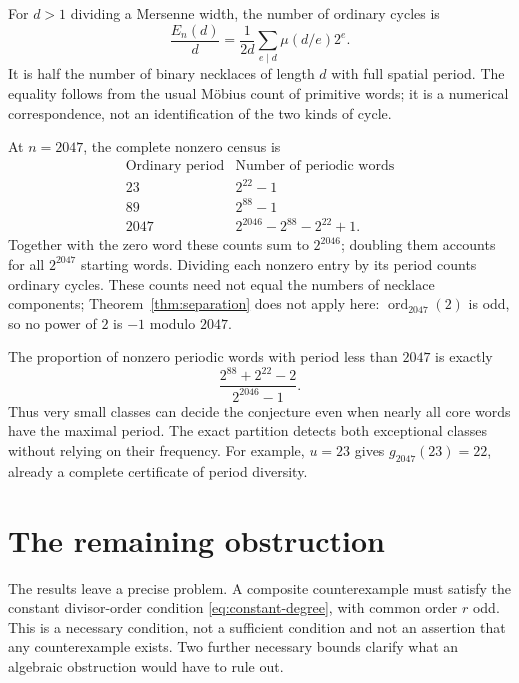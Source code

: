 \documentclass[11pt]{article}
\theoremstyle{definition}
\theoremstyle{remark}
\numberwithin{equation}{section}
\DeclareMathOperator{\ord}{ord}
\begin{document}
For $d>1$ dividing a Mersenne width, the number of ordinary cycles is
\begin{equation}\label{eq:primitive-necklaces}
 \frac{E_n(d)}d=\frac1{2d}\sum_{e\mid d}\mu(d/e)2^e.
\end{equation}
It is half the number of binary necklaces of length $d$ with full spatial
period. The equality follows from the usual M\"obius count of primitive
words; it is a numerical correspondence, not an identification of the
two kinds of cycle.

At $n=2047$, the complete nonzero census is
\begin{equation}\label{eq:2047}
 \begin{array}{c|l}
 \text{Ordinary period}&\text{Number of periodic words}\\\hline
 23&2^{22}-1\\
 89&2^{88}-1\\
 2047&2^{2046}-2^{88}-2^{22}+1.
 \end{array}
\end{equation}
Together with the zero word these counts sum to $2^{2046}$; doubling
them accounts for all $2^{2047}$ starting words. Dividing each nonzero
entry by its period counts ordinary cycles. These counts need not equal
the numbers of necklace components; Theorem~\ref{thm:separation} does not apply here:
$\ord_{2047}(2)$ is odd, so no power of $2$ is $-1$ modulo $2047$.

The proportion of nonzero periodic words with period less than $2047$ is
exactly
\begin{equation}\label{eq:rare-periods}
 \frac{2^{88}+2^{22}-2}{2^{2046}-1}.
\end{equation}
Thus very small classes can decide the conjecture even when nearly all
core words have the maximal period. The exact partition detects both
exceptional classes without relying on their frequency. For example,
$u=23$ gives $g_{2047}(23)=22$, already a complete certificate of
period diversity.

\section{The remaining obstruction}\label{sec:remaining}

The results leave a precise problem. A composite counterexample must
satisfy the constant divisor-order condition
\eqref{eq:constant-degree}, with common order $r$ odd. This is a
necessary condition, not a sufficient condition and not an assertion
that any counterexample exists. Two further necessary bounds clarify
what an algebraic obstruction would have to rule out.
\end{document}
